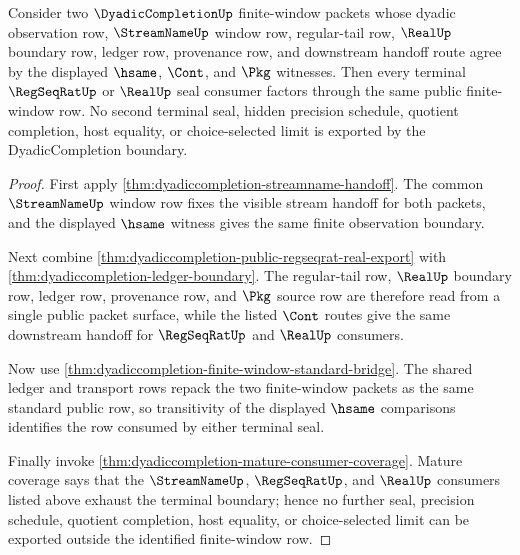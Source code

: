 \begin{theorem}\label{thm:dyadiccompletion-terminal-window-seal-determinacy}
Consider two $\DyadicCompletionUp$ finite-window packets whose dyadic
observation row, $\StreamNameUp$ window row, regular-tail row, $\RealUp$
boundary row, ledger row, provenance row, and downstream handoff route agree by
the displayed $\hsame$, $\Cont$, and $\Pkg$ witnesses. Then every terminal
$\RegSeqRatUp$ or $\RealUp$ seal consumer factors through the same public
finite-window row. No second terminal seal, hidden precision schedule, quotient
completion, host equality, or choice-selected limit is exported by the
DyadicCompletion boundary.
\end{theorem}
\begin{proof}
First apply \autoref{thm:dyadiccompletion-streamname-handoff}. The common
$\StreamNameUp$ window row fixes the visible stream handoff for both packets,
and the displayed $\hsame$ witness gives the same finite observation boundary.

Next combine \autoref{thm:dyadiccompletion-public-regseqrat-real-export} with
\autoref{thm:dyadiccompletion-ledger-boundary}. The regular-tail row,
$\RealUp$ boundary row, ledger row, provenance row, and $\Pkg$ source row are
therefore read from a single public packet surface, while the listed $\Cont$
routes give the same downstream handoff for $\RegSeqRatUp$ and $\RealUp$
consumers.

Now use \autoref{thm:dyadiccompletion-finite-window-standard-bridge}. The
shared ledger and transport rows repack the two finite-window packets as the
same standard public row, so transitivity of the displayed $\hsame$ comparisons
identifies the row consumed by either terminal seal.

Finally invoke \autoref{thm:dyadiccompletion-mature-consumer-coverage}. Mature
coverage says that the $\StreamNameUp$, $\RegSeqRatUp$, and $\RealUp$ consumers
listed above exhaust the terminal boundary; hence no further seal, precision
schedule, quotient completion, host equality, or choice-selected limit can be
exported outside the identified finite-window row.
\end{proof}

